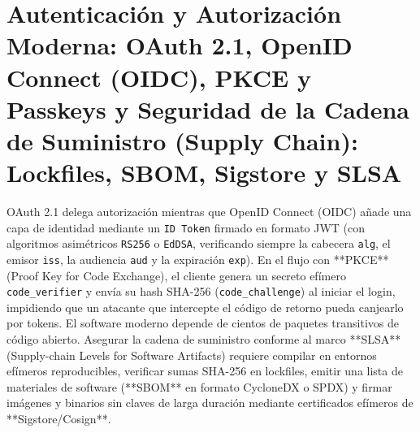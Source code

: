 \documentclass{book}
\begin{document}
\section{Autenticación y Autorización Moderna: OAuth 2.1, OpenID Connect (OIDC), PKCE y Passkeys y Seguridad de la Cadena de Suministro (Supply Chain): Lockfiles, SBOM, Sigstore y SLSA}

OAuth 2.1 delega autorización mientras que OpenID Connect (OIDC) añade una capa de identidad mediante un \texttt{ID Token} firmado en formato JWT (con algoritmos asimétricos \texttt{RS256} o \texttt{EdDSA}, verificando siempre la cabecera \texttt{alg}, el emisor \texttt{iss}, la audiencia \texttt{aud} y la expiración \texttt{exp}). En el flujo con **PKCE** (Proof Key for Code Exchange), el cliente genera un secreto efímero \texttt{code\_verifier} y envía su hash SHA-256 (\texttt{code\_challenge}) al iniciar el login, impidiendo que un atacante que intercepte el código de retorno pueda canjearlo por tokens.
El software moderno depende de cientos de paquetes transitivos de código abierto. Asegurar la cadena de suministro conforme al marco **SLSA** (Supply-chain Levels for Software Artifacts) requiere compilar en entornos efímeros reproducibles, verificar sumas SHA-256 en lockfiles, emitir una lista de materiales de software (**SBOM** en formato CycloneDX o SPDX) y firmar imágenes y binarios sin claves de larga duración mediante certificados efímeros de **Sigstore/Cosign**.
\end{document}
